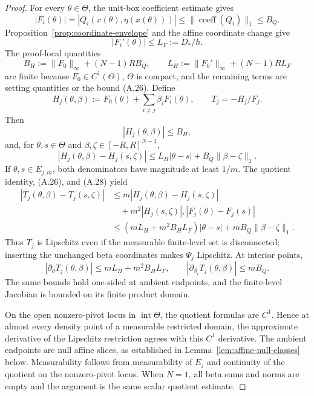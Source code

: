 \begin{proof}
For every $\theta\in\Theta$, the unit-box coefficient estimate gives
\[
|F_i(\theta)|
=|Q_i(x(\theta),\eta(x(\theta)))|
\leq\|\operatorname{coeff}(Q_i)\|_1
\leq B_Q.
\tag{A.25}
\]
Proposition~\ref{prop:coordinate-envelope} and the affine coordinate change
give
\[
|F_i'(\theta)|\leq L_F:=D_*/h.
\tag{A.26}
\]
The proof-local quantities
\[
B_H:=\|F_0\|_\infty+(N-1)RB_Q,
\qquad
L_H:=\|F_0'\|_\infty+(N-1)RL_F
\tag{A.27}
\]
are finite because $F_0\in C^1(\Theta)$, $\Theta$ is compact, and the
remaining terms are setting quantities or the bound (A.26).  Define
\[
H_j(\theta,\beta)
:=F_0(\theta)+\sum_{i\neq j}\beta_iF_i(\theta),
\qquad
T_j=-H_j/F_j.
\]
Then
\[
|H_j(\theta,\beta)|\leq B_H,
\]
and, for $\theta,s\in\Theta$ and
$\beta,\zeta\in[-R,R]^{N-1}$,
\[
|H_j(\theta,\beta)-H_j(s,\zeta)|
\leq L_H|\theta-s|+B_Q\|\beta-\zeta\|_1.
\tag{A.28}
\]
If $\theta,s\in E_{j,m}$, both denominators have magnitude at least $1/m$.
The quotient identity, (A.26), and (A.28) yield
\[
\begin{aligned}
|T_j(\theta,\beta)-T_j(s,\zeta)|
&\leq m|H_j(\theta,\beta)-H_j(s,\zeta)|\\
&\quad+m^2|H_j(s,\zeta)|,|F_j(\theta)-F_j(s)|\\
&\leq(mL_H+m^2B_HL_F)|\theta-s|
 +mB_Q\|\beta-\zeta\|_1.
\end{aligned}
\tag{A.29}
\]
Thus $T_j$ is Lipschitz even if the measurable finite-level set is
disconnected; inserting the unchanged beta coordinates makes $\Psi_j$
Lipschitz.  At interior points,
\[
|\partial_\theta T_j(\theta,\beta)|
\leq mL_H+m^2B_HL_F,
\qquad
|\partial_{\beta_i}T_j(\theta,\beta)|
\leq mB_Q.
\tag{A.30}
\]
The same bounds hold one-sided at ambient endpoints, and the finite-level
Jacobian is bounded on its finite product domain.

On the open nonzero-pivot locus in $\operatorname{int}\Theta$, the quotient
formulas are $C^1$.  Hence at almost every density point of a measurable
restricted domain, the approximate derivative of the Lipschitz restriction
agrees with this $C^1$ derivative.  The ambient endpoints are null affine
slices, as established in Lemma~\ref{lem:affine-null-classes} below.
Measurability follows from measurability of $E_j$ and continuity of the
quotient on the nonzero-pivot locus.  When $N=1$, all beta sums and norms are
empty and the argument is the same scalar quotient estimate.
\end{proof}

